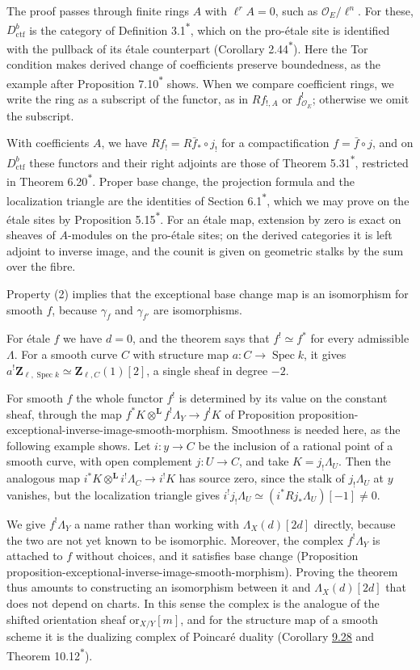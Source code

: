 \documentclass[11pt]{article}
\newcommand{\bpout}[1]{#1\textsuperscript{\hyperlink{bp-outside}{\ensuremath{\ast}}}}
\begin{document}
The proof passes through finite rings \(A\) with \(\ell^rA=0\), such as \(\mathcal O_E/\ell^n\). For these, \(D^b_{\mathrm{ctf}}\) is the category of Definition \bpout{3.1}, which on the pro-étale site is identified with the pullback of its étale counterpart (Corollary \bpout{2.44}). Here the Tor condition makes derived change of coefficients preserve boundedness, as the example after Proposition \bpout{7.10} shows. When we compare coefficient rings, we write the ring as a subscript of the functor, as in \(Rf_{!,A}\) or \(f^!_{\mathcal O_E}\); otherwise we omit the subscript.

With coefficients \(A\), we have \(Rf_!=R\bar f_*\circ j_!\) for a compactification \(f=\bar f\circ j\), and on \(D^b_{\mathrm{ctf}}\) these functors and their right adjoints are those of Theorem \bpout{5.31}, restricted in Theorem \bpout{6.20}. Proper base change, the projection formula and the localization triangle are the identities of Section \bpout{6.1}, which we may prove on the étale sites by Proposition \bpout{5.15}. For an étale map, extension by zero is exact on sheaves of \(A\)-modules on the pro-étale sites; on the derived categories it is left adjoint to inverse image, and the counit is given on geometric stalks by the sum over the fibre.

Property (2) implies that the exceptional base change map is an isomorphism for smooth \(f\), because \(\gamma_f\) and \(\gamma_{f'}\) are isomorphisms.

For étale \(f\) we have \(d=0\), and the theorem says that \(f^{!}\simeq f^{*}\) for every admissible \(\Lambda\). For a smooth curve \(C\) with structure map \(a:C\to\operatorname{Spec}k\), it gives \(a^!\mathbf Z_{\ell,\operatorname{Spec}k}\simeq\mathbf Z_{\ell,C}(1)[2]\), a single sheaf in degree \(-2\).

For smooth \(f\) the whole functor \(f^!\) is determined by its value on the constant sheaf, through the map \(f^*K\otimes^{\mathbf L}f^!\Lambda_Y\to f^!K\) of Proposition proposition-exceptional-inverse-image-smooth-morphism. Smoothness is needed here, as the following example shows. Let \(i:y\to C\) be the inclusion of a rational point of a smooth curve, with open complement \(j:U\to C\), and take \(K=j_!\Lambda_U\). Then the analogous map \(i^*K\otimes^{\mathbf L}i^!\Lambda_C\to i^!K\) has source zero, since the stalk of \(j_!\Lambda_U\) at \(y\) vanishes, but the localization triangle gives \(i^!j_!\Lambda_U\simeq(i^*Rj_*\Lambda_U)[-1]\neq0\).

We give \(f^!\Lambda_Y\) a name rather than working with \(\Lambda_X(d)[2d]\) directly, because the two are not yet known to be isomorphic. Moreover, the complex \(f^!\Lambda_Y\) is attached to \(f\) without choices, and it satisfies base change (Proposition proposition-exceptional-inverse-image-smooth-morphism). Proving the theorem thus amounts to constructing an isomorphism between it and \(\Lambda_X(d)[2d]\) that does not depend on charts. In this sense the complex is the analogue of the shifted orientation sheaf \(\mathrm{or}_{X/Y}[m]\), and for the structure map of a smooth scheme it is the dualizing complex of Poincaré duality (Corollary \hyperref[bp96]{9.28} and Theorem \bpout{10.12}).
\end{document}
